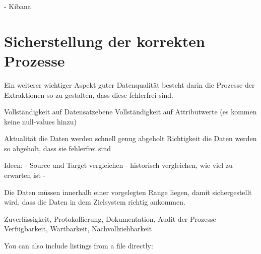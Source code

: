 - Kibana 

\section{Sicherstellung der korrekten Prozesse}
Ein weiterer wichtiger Aspekt guter Datenqualität besteht darin die Prozesse der Extraktionen so zu gestalten, dass diese fehlerfrei sind.

Vollständigkeit auf Datensatzebene
Vollständigkeit auf Attributwerte (es kommen keine null-values hinzu)


Aktualität die Daten werden schnell genug abgeholt
Richtigkeit die Daten werden so abgeholt, dass sie fehlerfrei sind

Ideen:
- Source und Target vergleichen
- historisch vergleichen, wie viel zu erwarten ist
- 

Die Daten müssen innerhalb einer vorgelegten Range liegen, damit sichergestellt wird, dass die Daten in dem Zielsystem richtig ankommen.



Zuverlässigkeit, Protokollierung, Dokumentation, Audit der Prozesse
 Verfügbarkeit, Wartbarkeit, Nachvollziehbarkeit







You can also include listings from a file directly:


